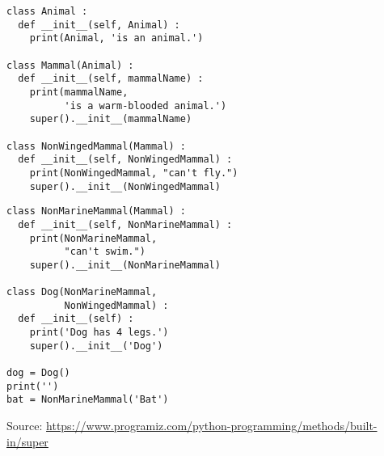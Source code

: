 \begin{frame}[fragile]
%
\begin{tcbraster}[raster columns=2,
                  raster equal height,
                  nobeforeafter,
                  raster column skip=0.2cm]
\begin{codebox}
\begin{verbatim}
class Animal :
  def __init__(self, Animal) :
    print(Animal, 'is an animal.')
    
class Mammal(Animal) :
  def __init__(self, mammalName) :
    print(mammalName, 
          'is a warm-blooded animal.')
    super().__init__(mammalName)

class NonWingedMammal(Mammal) :
  def __init__(self, NonWingedMammal) :
    print(NonWingedMammal, "can't fly.")
    super().__init__(NonWingedMammal)
\end{verbatim}
\end{codebox}
%
\begin{codebox}[... (continued)]
\begin{verbatim}
class NonMarineMammal(Mammal) :
  def __init__(self, NonMarineMammal) :
    print(NonMarineMammal, 
          "can't swim.")
    super().__init__(NonMarineMammal)
    
class Dog(NonMarineMammal,
          NonWingedMammal) :
  def __init__(self) :
    print('Dog has 4 legs.')
    super().__init__('Dog')

dog = Dog()
print('')
bat = NonMarineMammal('Bat')
\end{verbatim}
\end{codebox}
\end{tcbraster}
%
\begin{center}
	\scriptsize
	Source:
	\url{https://www.programiz.com/python-programming/methods/built-in/super}
\end{center}
%
\end{frame}



